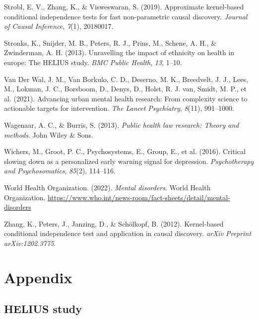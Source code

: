\documentclass[
]{article}
\newlength{\cslhangindent}
\newenvironment{CSLReferences}[2] %
 {\begin{list}{}{%
  \setlength{\itemindent}{0pt}
  \setlength{\leftmargin}{0pt}
  \setlength{\parsep}{0pt}
  \ifodd #1
   \setlength{\leftmargin}{\cslhangindent}
   \setlength{\itemindent}{-1\cslhangindent}
  \fi
  \setlength{\itemsep}{#2\baselineskip}}}
 {\end{list}}
\begin{document}
\begin{CSLReferences}{1}{0}
Strobl, E. V., Zhang, K., \& Visweswaran, S. (2019). Approximate
kernel-based conditional independence tests for fast non-parametric
causal discovery. \emph{Journal of Causal Inference}, \emph{7}(1),
20180017.

Stronks, K., Snijder, M. B., Peters, R. J., Prins, M., Schene, A. H., \&
Zwinderman, A. H. (2013). Unravelling the impact of ethnicity on health
in europe: The HELIUS study. \emph{BMC Public Health}, \emph{13}, 1--10.

Van Der Wal, J. M., Van Borkulo, C. D., Deserno, M. K., Breedvelt, J.
J., Lees, M., Lokman, J. C., Borsboom, D., Denys, D., Holst, R. J. van,
Smidt, M. P., et al. (2021). Advancing urban mental health research:
From complexity science to actionable targets for intervention.
\emph{The Lancet Psychiatry}, \emph{8}(11), 991--1000.

Wagenaar, A. C., \& Burris, S. (2013). \emph{Public health law research:
Theory and methods}. John Wiley \& Sons.

Wichers, M., Groot, P. C., Psychosystems, E., Group, E., et al. (2016).
Critical slowing down as a personalized early warning signal for
depression. \emph{Psychotherapy and Psychosomatics}, \emph{85}(2),
114--116.

World Health Organization. (2022). \emph{Mental disorders}. World Health
Organization.
\url{https://www.who.int/news-room/fact-sheets/detail/mental-disorders}

Zhang, K., Peters, J., Janzing, D., \& Schölkopf, B. (2012).
Kernel-based conditional independence test and application in causal
discovery. \emph{arXiv Preprint arXiv:1202.3775}.

\end{CSLReferences}

\section{Appendix}\label{sec-appendix}

\subsection{HELIUS study}\label{sec-helius}
\end{document}
